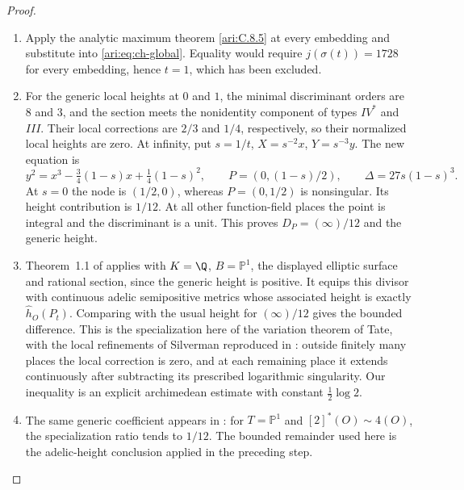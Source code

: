\begin{proof}
\begin{enumerate}[label=\arabic*.,leftmargin=*]
\item Apply the analytic maximum theorem \ref{ari:C.8.5} at every embedding
and substitute into \eqref{ari:eq:ch-global}. Equality would
require $j(\sigma(t))=1728$ for every embedding, hence $t=1$,
which has been excluded.

\item For the generic local heights at $0$ and $1$, the minimal
discriminant orders are $8$ and $3$, and the section meets
the nonidentity component of types $IV^*$ and $III$.
Their local corrections are $2/3$ and $1/4$, respectively,
so their normalized local heights are zero. At infinity,
put $s=1/t$, $X=s^{-2}x$, $Y=s^{-3}y$. The new equation is
\[
 y^2=x^3-\tfrac34(1-s)x+\tfrac14(1-s)^2,
 \qquad P=(0,(1-s)/2),\qquad\Delta=27s(1-s)^3.
\]
At $s=0$ the node is $(1/2,0)$, whereas $P=(0,1/2)$ is
nonsingular. Its height contribution is $1/12$.
At all other function-field places the point is integral
and the discriminant is a unit. This proves
$D_P=(\infty)/12$ and the generic height.

\item Theorem~1.1 of \citet[arXiv v2, p.~2]{demarco2017} applies with $K=\Q$,
$B=\mathbb P^1$, the displayed elliptic surface and rational
section, since the generic height is positive. It equips
this divisor with continuous adelic semipositive metrics
whose associated height is exactly $\widehat h_O(P_t)$.
Comparing with the usual height for $(\infty)/12$ gives the
bounded difference. This is the specialization here of the
variation theorem of Tate, with the local refinements of
Silverman reproduced in \citet[Theorems~2.2--2.3, arXiv v2, pp.~7--8]{demarco2017}:
outside finitely many places the local correction is zero,
and at each remaining place it extends continuously after
subtracting its prescribed logarithmic singularity.
Our inequality is an explicit archimedean estimate with
constant $\frac12\log2$.

\item The same generic coefficient appears in
\cite[Theorem~4.1 and the following remark, pp.~183--184]{callSilverman1993}:
for $T=\mathbb P^1$ and $[2]^*(O)\sim4(O)$, the specialization
ratio tends to $1/12$. The bounded remainder used here is the
adelic-height conclusion applied in the preceding step.
\end{enumerate}
\end{proof}